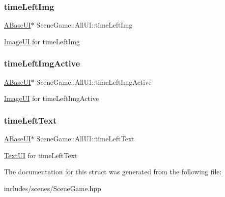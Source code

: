 \subsubsection{\texorpdfstring{time\+Left\+Img}{timeLeftImg}}
{\footnotesize\ttfamily \hyperlink{class_a_base_u_i}{A\+Base\+UI}$\ast$ Scene\+Game\+::\+All\+U\+I\+::time\+Left\+Img}

\hyperlink{class_image_u_i}{Image\+UI} for time\+Left\+Img \mbox{\label{struct_scene_game_1_1_all_u_i_af666a8139e97e44a3006499d7de86796}} 
\subsubsection{\texorpdfstring{time\+Left\+Img\+Active}{timeLeftImgActive}}
{\footnotesize\ttfamily \hyperlink{class_a_base_u_i}{A\+Base\+UI}$\ast$ Scene\+Game\+::\+All\+U\+I\+::time\+Left\+Img\+Active}

\hyperlink{class_image_u_i}{Image\+UI} for time\+Left\+Img\+Active \mbox{\label{struct_scene_game_1_1_all_u_i_aea70a8401c9c490dadcd30469a44803b}} 
\subsubsection{\texorpdfstring{time\+Left\+Text}{timeLeftText}}
{\footnotesize\ttfamily \hyperlink{class_a_base_u_i}{A\+Base\+UI}$\ast$ Scene\+Game\+::\+All\+U\+I\+::time\+Left\+Text}

\hyperlink{class_text_u_i}{Text\+UI} for time\+Left\+Text 

The documentation for this struct was generated from the following file\+:\begin{DoxyCompactItemize}
\item 
includes/scenes/Scene\+Game.\+hpp\end{DoxyCompactItemize}
